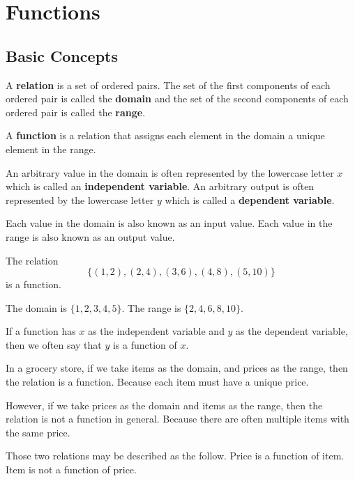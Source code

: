 
\section{Functions}

\subsection{Basic Concepts}
\begin{definition}
  A \textbf{relation} is a set of ordered pairs. The set of the first components of each ordered pair is called the \textbf{domain} and the set of the second components of each ordered pair is called the \textbf{range}.

  A \textbf{function} is a relation that assigns each element in the domain a unique element in the range.

  An arbitrary value in the domain is often represented by the lowercase letter $x$ which is called an \textbf{independent variable}.
  An arbitrary output is often represented by the lowercase letter $y$ which is called a \textbf{dependent variable}.
  
  Each value in the domain is also known as an input value. Each value in the range is also known as an output value.
\end{definition}

\begin{example}
  The relation 
  \[\{(1,2),(2,4),(3,6),(4,8),(5,10)\}\]
  is a function.
  
  The domain is $\{1,2,3,4,5\}$. The range is $\{2,4,6,8,10\}$.
\end{example}

If a function has $x$ as the independent variable and $y$ as the dependent variable, then we often say that $y$ is a function of $x$.

\begin{example}
  In a grocery store, if we take items as the domain, and prices as the range, then the relation is a function. Because each item must have a unique price.
  
  However, if we take prices as the domain and items as the range, then the relation is not a function in general. Because there are often multiple items with the same price.
  
  Those two relations may be described as the follow.
  Price is a function of item. Item is not a function of price.
\end{example}

